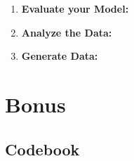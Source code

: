 \documentclass[11pt, a4paper]{article}
\begin{document}
\begin{enumerate}
	\item {\textbf{Evaluate your Model:}}
	\item {\textbf{Analyze the Data:}}
	\item {\textbf{Generate Data:}}
\end{enumerate}


\section{Bonus}
\label{sec:Bonus}

\begin{appendices}
	\section{Codebook}
	\label{appendix:codebook}
	
\end{appendices}
\end{document}
